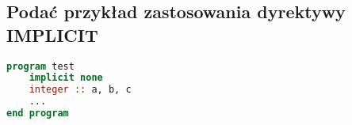 \subsection{Podać przykład zastosowania dyrektywy IMPLICIT}

\begin{lstlisting}[language=Fortran, caption=dyrektywa implicit]
program test
	implicit none
	integer :: a, b, c
	...
end program
\end{lstlisting}